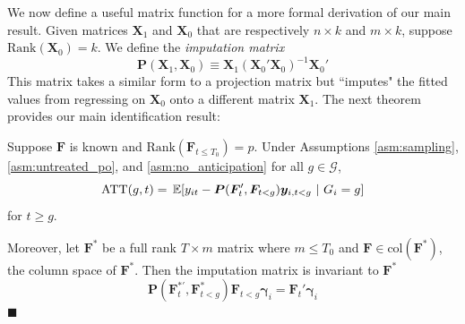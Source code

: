 \documentclass[12pt]{article}
\begin{document}
We now define a useful matrix function for a more formal derivation of our main result. Given matrices $\bm X_1$ and $\bm X_0$ that are respectively $n \times k$ and $m \times k$, suppose $\text{Rank}( \bm X_0) = k$. We define the \emph{imputation matrix} 
\begin{equation}
  \bm P(\bm X_1, \bm X_0) \equiv \bm X_1 (\bm X_0' \bm X_0)^{-1} \bm X_0'
\end{equation}
This matrix takes a similar form to a projection matrix but ``imputes" the fitted values from regressing on $\bm X_0$ onto a different matrix $\bm X_1$. The next theorem provides our main identification result:
\begin{theorem}\label{theorem:ATT_identification}
  Suppose $\bm{F}$ is known and $\text{Rank}(\bm{F}_{t \leq T_0}) = p$. Under Assumptions \ref{asm:sampling}, \ref{asm:untreated_po}, and \ref{asm:no_anticipation} for all $g \in \mathcal{G}$,
  \begin{equation}\label{eq:ATT_moments}
    \ATT(g,t) = \expec{y_{it} - \bm P(\bm{F}_{t}', \bm{F}_{t < g}) \bm y_{i,t < g}}{G_i = g}
  \end{equation}
  for $t \geq g$. 

  Moreover, let $\bm{F}^*$ be a full rank $T \times m$ matrix where $m \leq T_0$ and $\bm{F} \in \text{col}(\bm{F}^*)$, the column space of $\bm{F}^*$. Then the imputation matrix is invariant to $\bm{F}^*$
  \begin{equation}\label{eq:rotation_invariance}
    \bm P(\bm{F}_t^{*'}, \bm{F}^*_{t < g}) \bm{F}_{t < g} \bm \gamma_i = \bm{F}_t' \bm \gamma_i
  \end{equation}
  $\blacksquare$
\end{theorem}
\end{document}
